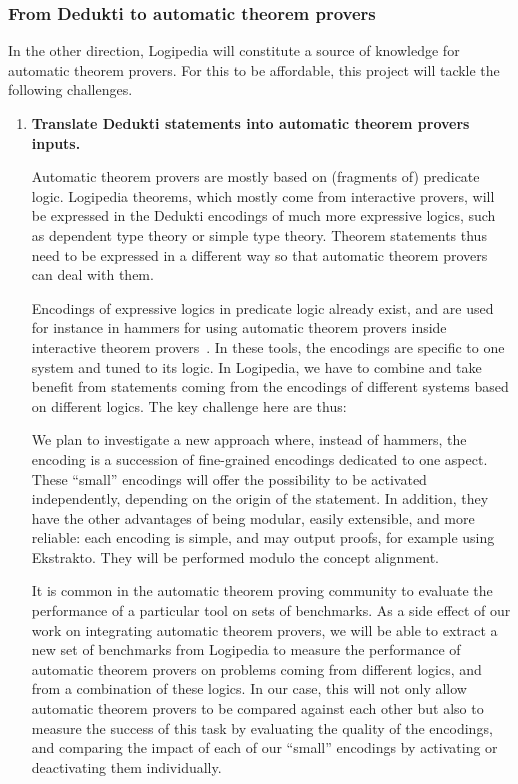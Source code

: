 \subsubsection*{From Dedukti to automatic theorem provers}

In the other direction, Logipedia will constitute a source of
knowledge for automatic theorem provers. For this to be affordable,
this project will tackle the following challenges.

\begin{enumerate}[\bf(a)]
\item{\bf Translate Dedukti statements into automatic theorem provers
  inputs.}

Automatic theorem provers are mostly based on (fragments of) predicate
logic.  Logipedia theorems, which mostly come from interactive
provers, will be expressed in the Dedukti encodings of much more
expressive logics, such as dependent type theory or simple type
theory.  Theorem statements thus need to be expressed in a different way
so that automatic theorem provers can deal with them.

Encodings of expressive logics in predicate logic already exist, and are used
for instance in hammers for using automatic theorem provers inside
interactive theorem
provers~\cite{DBLP:conf/lpar/PaulsonB10,DBLP:journals/jar/CzajkaK18}.  In these
tools, the encodings are specific to one system and tuned to its logic. In
Logipedia, we have to combine and take benefit from statements coming from the
encodings of different systems based on different logics. The key challenge here
are thus:

We plan to investigate a new approach where, instead of hammers, the
encoding is a succession of fine-grained encodings dedicated to one
aspect. These ``small'' encodings will offer the possibility to be
activated independently, depending on the origin of the statement. In
addition, they have the other advantages of being modular, easily
extensible, and more reliable: each encoding is simple, and may output
proofs, for example using Ekstrakto. They will be performed modulo the
concept alignment.

It is common in the automatic theorem proving community to evaluate
the performance of a particular tool on sets of benchmarks. As a side
effect of our work on integrating automatic theorem provers, we will
be able to extract a new set of benchmarks from Logipedia to measure
the performance of automatic theorem provers on problems coming from
different logics, and from a combination of these logics. In our case,
this will not only allow automatic theorem provers to be compared against
each other but also
to measure the success of this task by evaluating the quality of the
encodings, and comparing the impact of each of our ``small'' encodings
by activating or deactivating them individually.


\end{enumerate}

